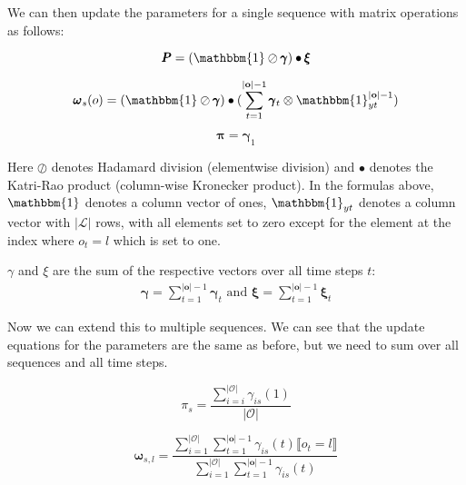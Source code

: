 We can then update the parameters for a single sequence with matrix operations as follows:

\begin{equation}
    \pmb{P}
    = (\mathbbm{1} \oslash \pmb{\gamma}) \bullet \pmb{\xi}
    \label{eq:transition-probabilities-multiple-sequences}
\end{equation}

\begin{equation}
    \pmb{\omega}
    _s(o) = (\mathbbm{1} \oslash \pmb{\gamma}) \bullet (\sum_{t=1}^{|\mathbf{o}|-1} \pmb{\gamma}_t \otimes \mathbbm{1}_{yt}^{|\mathbf{o}|-1})
    \label{eq:omega-multiple-sequences}
\end{equation}

\begin{equation}
    \pmb{\pi}
    = \pmb{\gamma}_1
    \label{eq:initial-probabilities-multiple-sequences}
\end{equation}

Here $\oslash$ denotes Hadamard division (elementwise division) and $\bullet$ denotes the Katri-Rao product (column-wise Kronecker product).
In the formulas above, $\mathbbm{1}$ denotes a column vector of ones, $\mathbbm{1}_{yt}$ denotes a column vector with $|\mathcal{L}|$ rows, with all elements set to zero except for the element at the index where $o_t = l$ which is set to one.

$\gamma$ and $\xi$ are the sum of the respective vectors over all time steps $t$:
\begin{align}
    \pmb{\gamma} = \sum_{t=1}^{|\mathbf{o}|-1} \pmb{\gamma}_t
    \text{ and }
    \pmb{\xi} = \sum_{t=1}^{|\mathbf{o}|-1} \pmb{\xi}_t
\end{align}

Now we can extend this to multiple sequences.
We can see that the update equations for the parameters are the same as before, but we need to sum over all sequences and all time steps.

\begin{equation}
    \pi_s = \frac{\sum_{i=i}^{|\mathcal{O}|} \gamma_{is}(1) }{|\mathcal{O}|}
\end{equation}

\begin{equation}
    \pmb{\omega}_{s, l} = \frac{\sum_{i=1}^{|\mathcal{O}|} \sum_{t=1}^{|\mathbf{o}|-1} \gamma_{is}(t) \lBrack o_t = l \rBrack}{\sum_{i=1}^{|\mathcal{O}|} \sum_{t=1}^{|\mathbf{o}|-1} \gamma_{is}(t)}
\end{equation}

